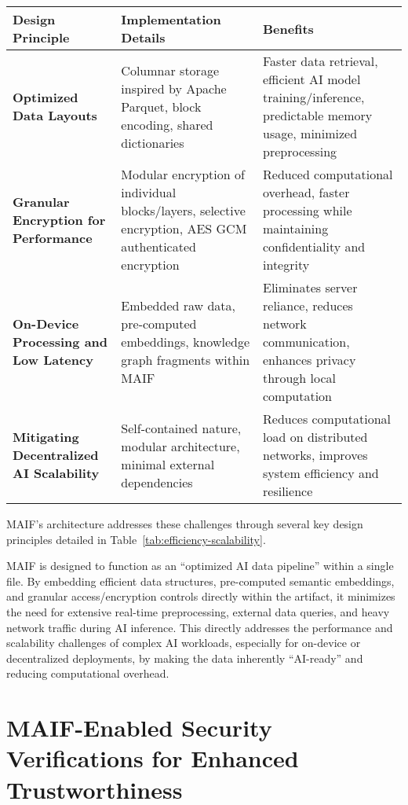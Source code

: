 \documentclass[conference]{IEEEtran}
\begin{document}
\begin{table*}[!t]
\renewcommand{\arraystretch}{1.3}
\caption{MAIF Efficiency and Scalability Design Principles}
\label{tab:efficiency-scalability}
\centering
\footnotesize
\begin{tabular}{p{3.5cm}p{5.5cm}p{5cm}}
\toprule
\textbf{Design Principle} & \textbf{Implementation Details} & \textbf{Benefits} \\
\midrule
\textbf{Optimized Data Layouts} & Columnar storage inspired by Apache Parquet, block encoding, shared dictionaries & Faster data retrieval, efficient AI model training/inference, predictable memory usage, minimized preprocessing\cite{ref75} \\
\textbf{Granular Encryption for Performance} & Modular encryption of individual blocks/layers, selective encryption, AES GCM authenticated encryption & Reduced computational overhead, faster processing while maintaining confidentiality and integrity\cite{ref64} \\
\textbf{On-Device Processing and Low Latency} & Embedded raw data, pre-computed embeddings, knowledge graph fragments within MAIF & Eliminates server reliance, reduces network communication, enhances privacy through local computation\cite{ref76} \\
\textbf{Mitigating Decentralized AI Scalability} & Self-contained nature, modular architecture, minimal external dependencies & Reduces computational load on distributed networks, improves system efficiency and resilience\cite{ref85} \\
\bottomrule
\end{tabular}
\end{table*}

MAIF's architecture addresses these challenges through several key design principles detailed in Table~\ref{tab:efficiency-scalability}.

MAIF is designed to function as an ``optimized AI data pipeline'' within a single file. By embedding efficient data structures, pre-computed semantic embeddings, and granular access/encryption controls directly within the artifact, it minimizes the need for extensive real-time preprocessing, external data queries, and heavy network traffic during AI inference. This directly addresses the performance and scalability challenges of complex AI workloads, especially for on-device or decentralized deployments, by making the data inherently ``AI-ready'' and reducing computational overhead.

\section{MAIF-Enabled Security Verifications for Enhanced Trustworthiness}
\label{sec:security}
\end{document}
